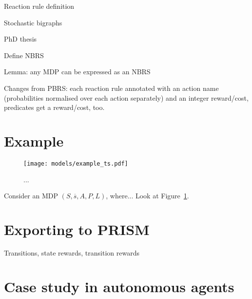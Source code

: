 \documentclass[runningheads]{llncs}
\begin{document}
Reaction rule definition \cite{DBLP:journals/corr/abs-1111-0086}

Stochastic bigraphs \cite{DBLP:journals/entcs/KrivineMT08}

PhD thesis \cite{DBLP:phd/ethos/Sevegnani12}

Define NBRS

Lemma: any MDP can be expressed as an NBRS

Changes from PBRS: each reaction rule annotated with an action name
(probabilities normalised over each action separately) and an integer
reward/cost, predicates get a reward/cost, too.

\section{Example}

\begin{figure}
  \texttt{[image: models/example\_ts.pdf]}
  \caption{...}
  \label{example_ts}
\end{figure}



\begin{example}
  Consider an MDP $(S, \overline{s}, A, P, L)$, where...
  Look at Figure~\ref{example_ts}.
\end{example}

\section{Exporting to PRISM}

Transitions, state rewards, transition rewards

\section{Case study in autonomous agents}



\end{document}
